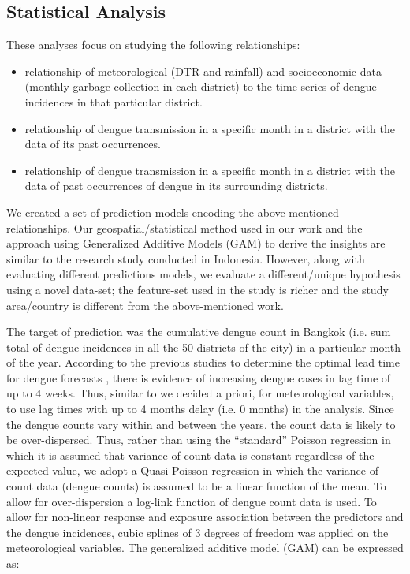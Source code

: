 \documentclass{bmcart}
\begin{document}
\subsection{Statistical Analysis} \label{stat}

These analyses focus on studying the following relationships:

\begin{itemize}
	\item relationship of meteorological (DTR and rainfall) and socioeconomic data (monthly garbage collection in each district) to the time series of dengue incidences in that particular district. 
	\item relationship of dengue transmission in a specific month in a district with the data of its past occurrences. 
	\item relationship of dengue transmission in a specific month in a district with the data of past occurrences of dengue in its surrounding districts. 
\end{itemize}


We created a set of prediction models encoding the above-mentioned relationships. Our geospatial/statistical method used in our work and the approach using Generalized Additive Models (GAM) to derive the insights are similar to the research study \cite{ramadona2016prediction} conducted in Indonesia. However, along with evaluating different predictions models, we evaluate a different/unique hypothesis using a novel data-set; the feature-set used in the study is richer and the study area/country is different from the above-mentioned work. 

The target of prediction was the  cumulative dengue count in Bangkok (i.e. sum total of dengue incidences in all the 50 districts of the city) in a particular month of the year. According to the previous studies to determine the optimal lead time for dengue forecasts \cite{hii2012optimal}, there is evidence of increasing dengue cases in lag time of up to 4 weeks. Thus, similar to \cite{ramadona2016prediction} we decided a priori, for meteorological variables, to use lag times with up to 4 months delay (i.e. 0 months) in the analysis.  Since the dengue counts vary within and between the years, the count data is likely to be over-dispersed. Thus, rather than using the ``standard'' Poisson regression in which it is assumed that variance of count data is constant regardless of the expected value, we adopt a Quasi-Poisson regression in which the variance of count data (dengue counts) is assumed to be a linear function of the mean. To allow for over-dispersion a log-link function of dengue count data is used. To allow for non-linear response and exposure association between the predictors and the dengue incidences, cubic splines of 3 degrees of freedom was applied on the meteorological variables. The generalized additive model (GAM) can be expressed as:
\end{document}
